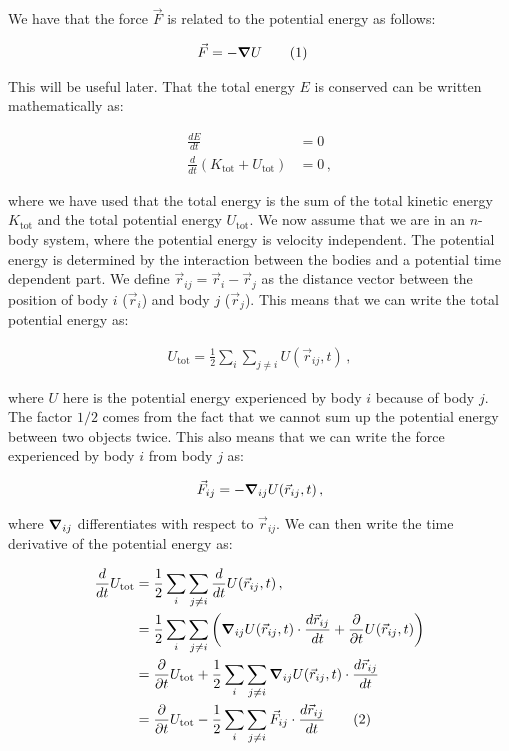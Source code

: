 \documentclass[reprint,english,notitlepage]{revtex4-1}  %
\newcommand\numberthis{\addtocounter{equation}{1}\tag{\theequation}}
\begin{document}
We have that the force $\vec{F}$ is related to the potential energy as follows:

\begin{align*}
\vec{F} &= - \gradient U \numberthis \label{eq:force_pot_en}
\end{align*}

This will be useful later. That the total energy $E$ is conserved can be written mathematically as:

\begin{align*}
\frac{dE}{dt} &= 0 \\
\frac{d}{dt} (K_\text{tot} + U_\text{tot}) &= 0 \, ,
\end{align*} 

where we have used that the total energy is the sum of the total kinetic energy $K_\text{tot}$ and the total potential energy $U_\text{tot}$. We now assume that we are in an $n$-body system, where the potential energy is velocity independent. The potential energy is determined by the interaction between the bodies and a potential time dependent part. We define $\vec{r}_{ij} = \vec{r}_i - \vec{r}_j$ as the distance vector between the position of body $i$ ($\vec{r}_i$) and body $j$ ($\vec{r}_j$). This means that we can write the total potential energy as:

\begin{align*}
U_\text{tot} = \frac{1}{2}\sum\limits_i \sum\limits_{j\neq i} U(\vec{r}_{ij},t) \, ,
\end{align*}

where $U$ here is the potential energy experienced by body $i$ because of body $j$. The factor $1/2$ comes from the fact that we cannot sum up the potential energy between two objects twice. This also means that we can write the force experienced by body $i$ from body $j$ as:

\begin{align*}
\vec{F}_{ij} = - \gradient_{ij} U(\vec{r}_{ij}, t) \, ,
\end{align*}

where $\gradient_{ij}$ differentiates with respect to $\vec{r}_{ij}$. We can then write the time derivative of the potential energy as:

\begin{align*}
\frac{d}{dt}U_\text{tot} &= \frac{1}{2}\sum\limits_{i} \sum\limits_{j\neq i} \frac{d}{dt} U (\vec{r}_{ij}, t ) \, , \\
&= \frac{1}{2}\sum\limits_{i} \sum\limits_{j\neq i} \bigg( \gradient_{ij} U (\vec{r}_{ij}, t ) \cdot \frac{d\vec{r}_{ij}}{dt} + \frac{\partial }{\partial t} U(\vec{r}_{ij}, t) \bigg) \\
&= \frac{\partial}{\partial t} U_\text{tot} + \frac{1}{2}\sum\limits_{i} \sum\limits_{j\neq i} \gradient_{ij} U (\vec{r}_{ij}, t ) \cdot \frac{d\vec{r}_{ij}}{dt} \\
&= \frac{\partial}{\partial t} U_\text{tot} - \frac{1}{2}\sum\limits_{i} \sum\limits_{j\neq i} \vec{F}_{ij} \cdot \frac{d\vec{r}_{ij}}{dt} \numberthis \label{eq:pot_en_der}
\end{align*}
\end{document}
